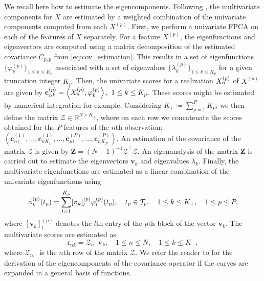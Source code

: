 We recall here how to estimate the eigencomponents. Following \citet[Prop.~5]{happMultivariateFunctionalPrincipal2018a}, the multivariate components for $X$ are estimated by a weighted combination of the univariate components computed from each $X^{(p)}$. First, we perform a univariate FPCA on each of the features of $X$ separately. For a feature $X^{(p)}$, the eigenfunctions and eigenvectors are computed using a matrix decomposition of the estimated covariance $C_{p, p}$ from \eqref{eq:cov_estimation}. This results in a set of eigenfunctions $\{\varphi_k^{(p)}\}_{1 \leq k \leq K_p}$ associated with a set of eigenvalues $\{\lambda_k^{(p)}\}_{1 \leq k \leq K_p}$ for a given truncation integer $K_p$. Then, the univariate scores for a realization $X_n^{(p)}$ of $X^{(p)}$ are given by $\mathbf{c}_{nk}^{(p)} = \left\langle X_n^{(p)}, \varphi_k^{(p)}\right\rangle, ~1 \leq k \leq K_p$. These scores might be estimated by numerical integration for example. Considering $K_+ \coloneqq \sum_{p = 1}^P K_p$, we then define the matrix $\mathcal{Z} \in \mathbb{R}^{N \times K_+}$, where on each row we concatenate the scores obtained for the $P$ features of the $n$th observation: 
$(\mathbf{c}_{n1}^{(1)}, \ldots, \mathbf{c}_{nK_1}^{(1)}, \ldots, \mathbf{c}_{n1}^{(P)}, \ldots, \mathbf{c}_{nK_P}^{(P)})$. An estimation of the covariance of the matrix $\mathcal{Z}$ is given by $\mathbf{Z} = (N - 1)^{-1}\mathcal{Z}^\top\mathcal{Z}$. An eigenanalysis of the matrix $\mathbf{Z}$ is carried out to estimate the eigenvectors $\boldsymbol{v}_k$ and eigenvalues $\lambda_k$. Finally, the multivariate eigenfunctions are estimated as a linear combination of the univariate eigenfunctions using
\begin{equation*}
\phi_k^{(p)}(t_p) = \sum_{l = 1}^{K_p}[\boldsymbol{v}_k]_{l}^{(p)}\varphi_{l}^{(p)}(t_p),\quad t_p \in \mathcal{T}_{p},\quad 1 \leq k \leq K_+,\quad 1 \leq p \leq P,
\end{equation*}
where $[\boldsymbol{v}_k]^{(p)}_{l}$ denotes the $l$th entry of the $p$th block of the vector $\boldsymbol{v}_k$. The multivariate scores are estimated as
$$\mathfrak{c}_{nk} = \mathcal{Z}_{{n,\cdot}}\boldsymbol{v}_k, \quad 1 \leq n \leq N, \quad 1 \leq k \leq K_+,$$
where $\mathcal{Z}_{{n,\cdot}}$ is the $n$th row of the matrix $\mathcal{Z}$.
We refer the reader to \cite{happMultivariateFunctionalPrincipal2018a} for the derivation of the eigencomponents of the covariance operator if the curves are expanded in a general basis of functions.


